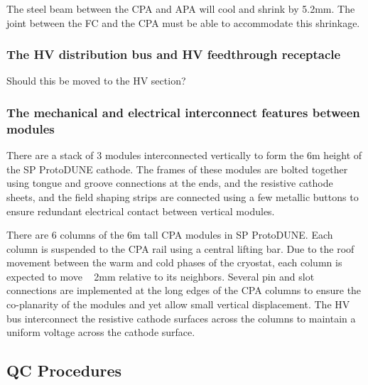 The steel beam between the CPA and APA will cool and shrink by 5.2mm.  The joint between the FC and the CPA must be able to accommodate this shrinkage.


\subsubsection{The HV distribution bus and HV feedthrough receptacle }

Should this be moved to the HV section?

\subsubsection{The mechanical and electrical interconnect features between modules}

There are a stack of 3 modules interconnected vertically to form the 6m height of the SP ProtoDUNE cathode.  The frames of these modules are bolted together using tongue and groove connections at the ends, and the resistive cathode sheets, and the field shaping strips are connected  using a few metallic buttons to ensure redundant electrical contact between vertical modules.

There are 6 columns of the 6m tall CPA modules in SP ProtoDUNE.  Each column is suspended to the CPA rail using a central lifting bar.  Due to the  roof movement between the warm and cold phases of the cryostat, each column is expected to move ~ 2mm relative to its neighbors.  Several pin and slot connections are implemented at the long edges of the CPA columns to ensure the co-planarity of the modules and yet allow small vertical displacement.  The HV bus interconnect the resistive cathode surfaces across the columns to maintain a uniform voltage across the cathode surface.

\subsection{QC Procedures}

